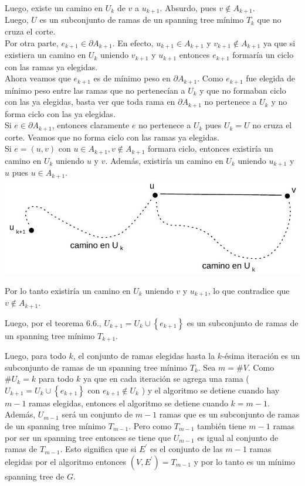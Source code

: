 \documentclass[10pt]{article}
\begin{document}
Luego, existe un camino en $U_{k}$ de $v$ a $u_{k+1}$. Absurdo, pues $v \notin A_{k+1}$.\\
Luego, $U$ es un subconjunto de ramas de un spanning tree mínimo $T_{k}$ que no cruza el corte.\\
Por otra parte, $e_{k+1} \in \partial A_{k+1}$. En efecto, $u_{k+1} \in A_{k+1}$ y $v_{k+1} \notin A_{k+1}$ ya que si existiera un camino en $U_{k}$ uniendo $v_{k+1}$ y $u_{k+1}$ entonces $e_{k+1}$ formaría un ciclo con las ramas ya elegidas.\\
Ahora veamos que $e_{k+1}$ es de mínimo peso en $\partial A_{k+1}$. Como $e_{k+1}$ fue elegida de mínimo peso entre las ramas que no pertenecían a $U_{k}$ y que no formaban ciclo con las ya elegidas, basta ver que toda rama en $\partial A_{k+1}$ no pertenece a $U_{k}$ y no forma ciclo con las ya elegidas.\\
Si $e \in \partial A_{k+1}$, entonces claramente $e$ no pertenece a $U_{k}$ pues $U_{k}=U$ no cruza el corte. Veamos que no forma ciclo con las ramas ya elegidas.\\
Si $e=(u, v)$ con $u \in A_{k+1}, v \notin A_{k+1}$ formara ciclo, entonces existiría un camino en $U_{k}$ uniendo $u$ y $v$. Además, existiría un camino en $U_{k}$ uniendo $u_{k+1}$ y $u$ pues $u \in A_{k+1}$.\\
\includegraphics[max width=\textwidth, center]{2025_09_05_93c7c1835f249f70c0eeg-18}

Por lo tanto existiría un camino en $U_{k}$ uniendo $v$ y $u_{k+1}$, lo que contradice que $v \notin A_{k+1}$.

Luego, por el teorema 6.6., $U_{k+1}=U_{k} \cup\left\{e_{k+1}\right\}$ es un subconjunto de ramas de un spanning tree mínimo $T_{k+1}$.

Luego, para todo $k$, el conjunto de ramas elegidas hasta la $k$-ésima iteración es un subconjunto de ramas de un spanning tree mínimo $T_{k}$. Sea $m=\# V$. Como $\# U_{k}=k$ para todo $k$ ya que en cada iteración se agrega una rama ( $U_{k+1}=U_{k} \cup\left\{e_{k+1}\right\}$ con $e_{k+1} \notin U_{k}$ ) y el algoritmo se detiene cuando hay $m-1$ ramas elegidas, entonces el algoritmo se detiene cuando $k=m-1$. Además, $U_{m-1}$ será un conjunto de $m-1$ ramas que es un subconjunto de ramas de un spanning tree mínimo $T_{m-1}$. Pero como $T_{m-1}$ también tiene $m-1$ ramas por ser un spanning tree entonces se tiene que $U_{m-1}$ es igual al conjunto de ramas de $T_{m-1}$. Esto significa que si $E^{\prime}$ es el conjunto de las $m-1$ ramas elegidas por el algoritmo entonces $\left(V, E^{\prime}\right)=T_{m-1}$ y por lo tanto es un mínimo spanning tree de $G$.
\end{document}
